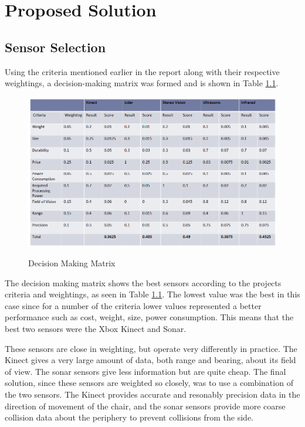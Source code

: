 \documentclass[oneside,final,a4paper]{report}
\begin{document}
\chapter{Proposed Solution}

\section{Sensor Selection}

Using the criteria mentioned earlier in the report along with their respective weightings, a decision-making matrix was formed and is shown in Table \ref{tab:decision_matrix}.

\begin{figure}[hbt]
 \centering
 \includegraphics[scale=0.45]{decision_matrix}\\
 \caption{Decision Making Matrix}
 \label{tab:decision_matrix}
\end{figure}

The decision making matrix shows the best sensors according to the projects criteria and weightings, as seen in Table \ref{tab:decision_matrix}. The lowest value was the best in this case since for a number of the criteria lower values represented a better performance such as cost, weight, size, power consumption. This means that the best two sensors were the Xbox Kinect and Sonar. 

These sensors are close in weighting, but operate very differently in practice. The Kinect gives a very large amount of data, both range and bearing, about its field of view. The sonar sensors give less information but are quite cheap. The final solution, since these sensors are weighted so closely, was to use a combination of the two sensors. The Kinect provides accurate and resonably precision data in the direction of movement of the chair, and the sonar sensors provide more coarse collision data about the periphery to prevent collisions from the side.
\end{document}
